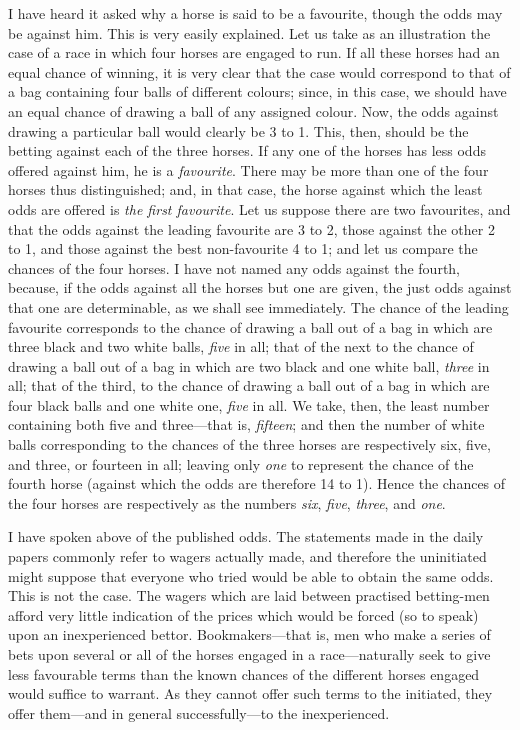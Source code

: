 \documentclass[letterpaper,12pt,oneside,openany]{memoir}
\begin{document}
I have heard it asked why a horse is said to be a
favourite, though the odds may be against him. This
is very easily explained. Let us take as an illustration
the case of a race in which four horses are engaged to
run. If all these horses had an equal chance of winning,
it is very clear that the case would correspond to
that of a bag containing four balls of different colours;
since, in this case, we should have an equal chance of
drawing a ball of any assigned colour. Now, the odds
against drawing a particular ball would clearly be 3 to
1. This, then, should be the betting against each of
the three horses. If any one of the horses has less odds
offered against him, he is a \textit{favourite}. There may be
more than one of the four horses thus distinguished;
and, in that case, the horse against which the least
odds are offered is \textit{the first favourite}. Let us suppose
there are two favourites, and that the odds against the
leading favourite are 3 to 2, those against the other 2
to 1, and those against the best non-favourite 4 to 1;
and let us compare the chances of the four horses. I
have not named any odds against the fourth, because, if
the odds against all the horses but one are given, the
just odds against that one are determinable, as we shall
see immediately. The chance of the leading favourite
corresponds to the chance of drawing a ball out of a bag
in which are three black and two white balls, \textit{five} in all;
that of the next to the chance of drawing a ball out of a
bag in which are two black and one white ball, \textit{three} in
all; that of the third, to the chance of drawing a ball
out of a bag in which are four black balls and one white
one, \textit{five} in all. We take, then, the least number containing
both five and three---that is, \textit{fifteen}; and then
the number of white balls corresponding to the chances
of the three horses are respectively six, five, and three,
or fourteen in all; leaving only \textit{one} to represent the
chance of the fourth horse (against which the odds are
therefore 14 to 1). Hence the chances of the four
horses are respectively as the numbers \textit{six}, \textit{five}, \textit{three},
and \textit{one}.

I have spoken above of the published odds. The
statements made in the daily papers commonly refer to
wagers actually made, and therefore the uninitiated
might suppose that everyone who tried would be able
to obtain the same odds. This is not the case. The
wagers which are laid between practised betting-men
afford very little indication of the prices which would be
forced (so to speak) upon an inexperienced bettor.
Bookmakers---that is, men who make a series of bets
upon several or all of the horses engaged in a race---naturally
seek to give less favourable terms than the
known chances of the different horses engaged would
suffice to warrant. As they cannot offer such terms to the
initiated, they offer them---and in general successfully---to
the inexperienced.
\end{document}
